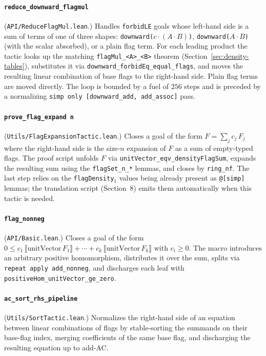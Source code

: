 \documentclass[11pt]{article}
\begin{document}
\paragraph{\texttt{reduce\_downward\_flagmul}}
(\texttt{API/ReduceFlagMul.lean}.) Handles \texttt{forbidLE} goals whose
left-hand side is a sum of terms of one of three shapes:
\texttt{downward(}$c \cdot (A \cdot B)$\texttt{)},
\texttt{downward(}$A \cdot B$\texttt{)} (with the scalar absorbed), or a
plain flag term. For each leading product the tactic looks up the
matching \texttt{flagMul\_<A>\_<B>} theorem (Section~\ref{sec:density-tables}),
substitutes it via \texttt{downward\_forbidEq\_equal\_flags}, and moves
the resulting linear combination of base flags to the right-hand side.
Plain flag terms are moved directly. The loop is bounded by a fuel of
$256$ steps and is preceded by a normalizing
\texttt{simp only [downward\_add, add\_assoc]} pass.

\paragraph{\texttt{prove\_flag\_expand n}}
(\texttt{Utils/FlagExpansionTactic.lean}.) Closes a goal of the form
$F = \sum_j c_j\,F_j$ where the right-hand side is the size-$n$ expansion
of $F$ as a sum of empty-typed flags. The proof script unfolds $F$ via
\texttt{unitVector\_eqv\_densityFlagSum}, expands the resulting sum using
the \texttt{flagSet\_n\_*} lemmas, and closes by \texttt{ring\_nf}. The
last step relies on the \texttt{flagDensity}$_1$ values being already
present as \texttt{@[simp]} lemmas; the translation script (Section~8)
emits them automatically when this tactic is needed.

\paragraph{\texttt{flag\_nonneg}}
(\texttt{API/Basic.lean}.) Closes a goal of the form
$0 \le c_1\,\llbracket\mathrm{unitVector}\,F_1\rrbracket + \cdots +
c_k\,\llbracket\mathrm{unitVector}\,F_k\rrbracket$ with $c_i \ge 0$. The
macro introduces an arbitrary positive homomorphism, distributes it over
the sum, splits via \texttt{repeat apply add\_nonneg}, and discharges each
leaf with \texttt{positiveHom\_unitVector\_ge\_zero}.

\paragraph{\texttt{ac\_sort\_rhs\_pipeline}}
(\texttt{Utils/SortTactic.lean}.) Normalizes the right-hand side of an
equation between linear combinations of flags by stable-sorting the
summands on their base-flag index, merging coefficients of the same base
flag, and discharging the resulting equation up to add-AC.
\end{document}
